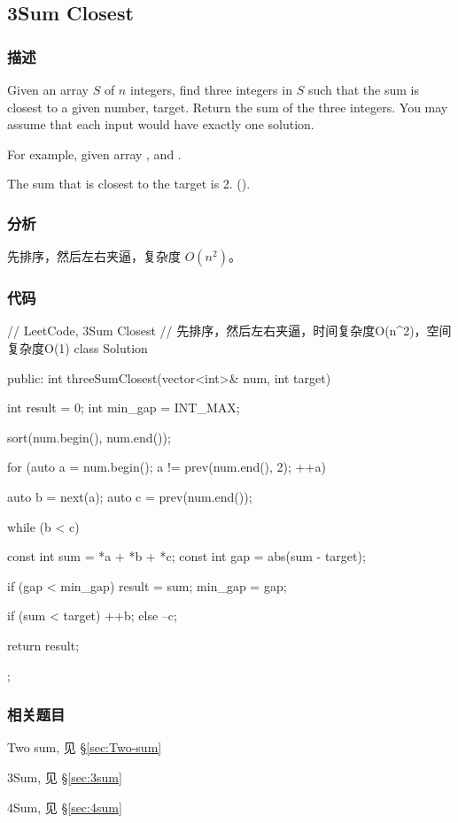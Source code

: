 \subsection{3Sum Closest} %
\label{sec:3sum-closest}


\subsubsection{描述}
Given an array $S$ of $n$ integers, find three integers in $S$ such that the 
sum is closest to a given number, target. Return the sum of the three integers. 
You may assume that each input would have exactly one solution.

For example, given array , and .

The sum that is closest to the target is 2. ().


\subsubsection{分析}
先排序，然后左右夹逼，复杂度 $O(n^2)$。


\subsubsection{代码}
\begin{Code}
	// LeetCode, 3Sum Closest
	// 先排序，然后左右夹逼，时间复杂度O(n^2)，空间复杂度O(1)
	class Solution {
		public:
		int threeSumClosest(vector<int>& num, int target) {
			int result = 0;
			int min_gap = INT_MAX;
			
			sort(num.begin(), num.end());
			
			for (auto a = num.begin(); a != prev(num.end(), 2); ++a) {
				auto b = next(a);
				auto c = prev(num.end());
				
				while (b < c) {
					const int sum = *a + *b + *c;
					const int gap = abs(sum - target);
					
					if (gap < min_gap) {
						result = sum;
						min_gap = gap;
					}
					
					if (sum < target) ++b;
					else              --c;
				}
			}
			
			return result;
		}
	};
\end{Code}


\subsubsection{相关题目}
\begindot
\item Two sum, 见 \S \ref{sec:Two-sum}
\item 3Sum, 见 \S \ref{sec:3sum}
\item 4Sum, 见 \S \ref{sec:4sum}
\myenddot



